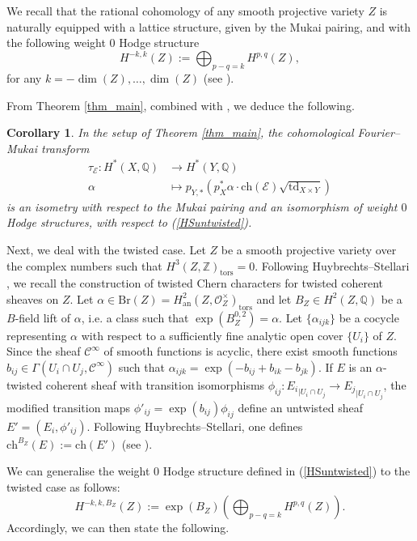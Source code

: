 \documentclass[12pt,a4paper]{amsart}
\theoremstyle{plain}
\newtheorem{cor}[thm]{Corollary}
\theoremstyle{definition}
\theoremstyle{remark}
\def\td{\operatorname{td}}
\def\ch{\mathrm{ch}}
\def\H{H}
\def\kO{\mathcal{O}}
\def\QQ{\mathbb{Q}}
\newcommand{\kE}{\mathcal{E}}
\newcommand{\ZZ}{\mathbb{Z}}
\newcommand{\Br}{\mathrm{Br}}
\begin{document}
We recall that the rational cohomology of any smooth projective variety $Z$ is naturally equipped with a lattice structure, given by the Mukai pairing, and with the following weight $0$ Hodge structure \begin{equation}
    \label{HSuntwisted} H^{-k,k}(Z):= \bigoplus_{p-q=k} H^{p,q}(Z),
\end{equation} for any $k= -\dim(Z),\dots, \dim(Z)$ (see \cite[Section 6.1]{Huy03}).

From Theorem \ref{thm_main}, combined with \cite[Proposition 5.39, 5.44]{Huy03}, we deduce the following.
\begin{cor}\label{cor_1}
	In the setup of Theorem \ref{thm_main}, 
 the cohomological Fourier--Mukai transform 
	\begin{align*}
		\tau_{\kE}\colon \H^{\ast}(X,\QQ)&\longrightarrow \H^{\ast}(Y,\QQ)\\
        \alpha &\longmapsto p_{Y,*}\left(p_X^*\alpha\cdot\ch(\kE)\sqrt{\td_{X\times Y}}\right)
	\end{align*}
    is an isometry with respect to the Mukai pairing and an isomorphism of weight $0$ Hodge structures, with respect to (\ref{HSuntwisted}).
\end{cor}

Next, we deal with the twisted case.
Let $Z$ be a smooth projective variety over the complex numbers such that $\H^3(Z,\ZZ)_{\mathrm{tors}}=0$. Following Huybrechts--Stellari \cite{paolo_huy}, we recall the construction of twisted Chern characters for twisted coherent sheaves on $Z$.
Let $\alpha\in \Br(Z)=\H^2_{\mathrm{an}}(Z,\kO_Z^\times)_{\mathrm{tors}}$ and let $B_Z\in\H^2(Z,\QQ)$ be a $B$-field lift of $\alpha$, i.e. a class such that $\exp(B_Z^{0,2})=\alpha$. 
Let $\{\alpha_{ijk}\}$ be a cocycle representing $\alpha$ with respect to a sufficiently fine analytic open cover $\{U_i\}$ of $Z$.
Since the sheaf $\mathcal{C}^{\infty}$ of smooth functions is acyclic, there exist smooth functions $b_{ij}\in \Gamma(U_i\cap U_j, \mathcal{C}^{\infty})$ such that $\alpha_{ijk}=\exp{(-b_{ij}+b_{ik}-b_{jk})}$.
If $E$ is an $\alpha$-twisted coherent sheaf with transition isomorphisms $\phi_{ij}:{E_i}_{|U_i\cap U_j}\to {E_j}_{|U_{i}\cap U_j}$, the modified transition maps $\phi'_{ij}=\exp(b_{ij})\phi_{ij}$
define an untwisted sheaf $E'=(E_{i},\phi'_{ij})$. Following Huybrechts--Stellari, one defines $\ch^{B_Z}(E):=\ch(E')$ (see \cite[Proposition 1.2]{paolo_huy}).

We can generalise the weight $0$ Hodge structure defined in (\ref{HSuntwisted}) to the twisted case as follows:
\begin{equation}\label{eq_defzeroHstru}
    \H^{-k,k,B_Z}(Z):=\exp(B_Z)\left(\bigoplus_{p-q=k}\H^{p,q}(Z)\right).
\end{equation}
Accordingly, we can then state the following.
\end{document}
